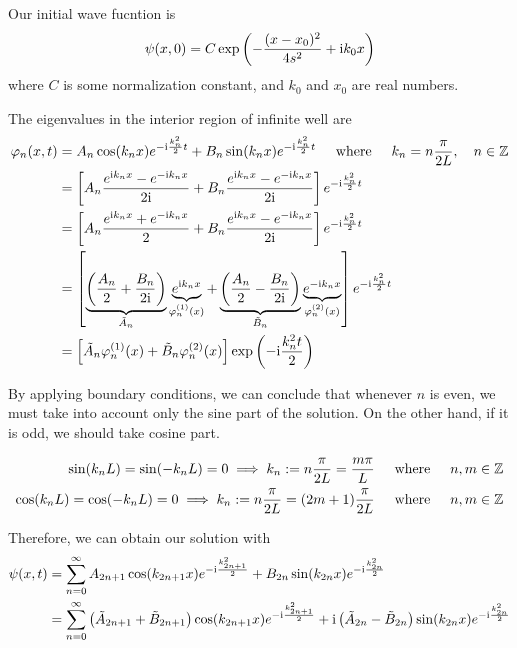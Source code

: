 \documentclass[12pt]{article}
\begin{document}
Our initial wave fucntion is\begin{equation}
\psi(x,0) = C \exp\left(-\frac{(x-x_0)^2}{4s^2} + \mathrm i k_0 x\right)
\end{equation}
where $C$ is some normalization constant, and $k_0$ and $x_0$ are real numbers.

The eigenvalues in the interior region of infinite well are\begin{align}
\varphi_n(x , t) &= A_n \cos(k_nx)e^{-\mathrm i \frac{k_n^2}{2} t} + B_n\sin(k_nx) e^{-\mathrm i \frac{k_n^2}{2} t} \hspace{5mm}\text{where}\hspace{5mm} k_n = n\frac{\pi}{2L},\quad n \in \mathbb{Z} \\
& = \left[A_n \frac{e^{\mathrm i k_nx}- e^{-\mathrm i k_n x} }{2\mathrm i}+ B_n \frac{e^{\mathrm i k_nx}- e^{-\mathrm i k_n x} }{2\mathrm i} \right]e^{-\mathrm i \frac{k_n^2}{2} t} \\ 
& = \left[A_n \frac{e^{\mathrm i k_nx}+e^{-\mathrm i k_n x} }{2}+ B_n \frac{e^{\mathrm i k_nx}- e^{-\mathrm i k_n x} }{2\mathrm i} \right]e^{-\mathrm i \frac{k_n^2}{2} t} \\ 
& = \left[\underbrace{\left(\frac{A_n}{2}+\frac{B_n}{2\mathrm i}\right)}_{\tilde A_n} \underbrace{e^{\mathrm i k_nx}}_{\varphi_n^{(1)}(x)} + \underbrace{\left(\frac{A_n}{2}-\frac{B_n}{2\mathrm i}\right)}_{\tilde B_n} \underbrace{e^{-\mathrm i k_nx}}_{\varphi_n^{(2)}(x)} \right]e^{-\mathrm i \frac{k_n^2}{2} t} \\ 
& = \left[\tilde A_n \varphi_n^{(1)}(x) + \tilde B_n \varphi_n^{(2)}(x)\right] \exp\left(- \mathrm i \frac{k_n^2t}{2}\right)
\end{align}

By applying boundary conditions, we can conclude that whenever $n$ is even, we must take into account only the sine part of the solution. On the other hand, if it is odd, we should take cosine part.

\begin{align}
\sin(k_nL) = \sin(-k_nL) = 0 \implies k_n := n\frac{\pi}{2L} = \frac{m\pi}{L}\hspace{5mm}\text{where}\hspace{5mm} n,m\in \mathbb Z \\ 
\cos(k_nL) = \cos(-k_nL) = 0 \implies k_n := n\frac{\pi}{2L} = (2m+1)\frac{\pi}{2L} \hspace{5mm}\text{where}\hspace{5mm} n,m\in \mathbb Z
\end{align}

Therefore, we can obtain our solution with\begin{align}
\psi(x,t) & = \sum_{n=0}^\infty A_{2n+1} \cos(k_{2n+1}x) e^{-\mathrm i \frac{k_{2n+1}^2}{2}} + B_{2n} \sin(k_{2n}x) e^{-\mathrm i \frac{k_{2n}^2}{2}} \\ 
& = \sum_{n=0}^\infty \left(\tilde A_{2n+1}+\tilde B_{2n+1}\right) \cos(k_{2n+1}x)e^{-\mathrm i \frac{k_{2n+1}^2}{2}} + \mathrm i\left(\tilde A_{2n}-\tilde B_{2n}\right) \sin(k_{2n}x)  e^{-\mathrm i \frac{k_{2n}^2}{2}}
\end{align}
\end{document}
